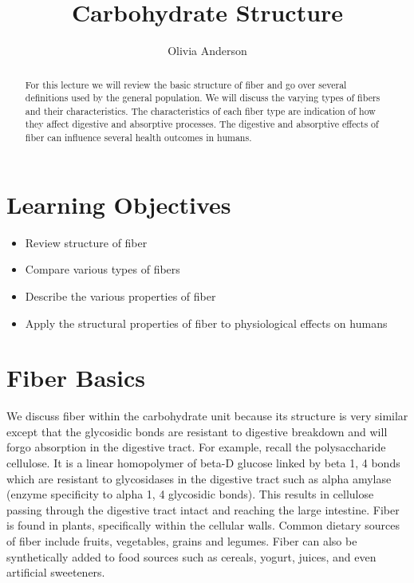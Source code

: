 \documentclass{tufte-handout}
\title{Carbohydrate Structure}
\author{Olivia Anderson}
\date{}  %
\begin{document}
\maketitle%
\begin{abstract}
For this lecture we will review the basic structure of fiber and go over several definitions used by the general population. We will discuss the varying types of fibers and their characteristics. The characteristics of each fiber type are indication of how they affect digestive and absorptive processes. The digestive and absorptive effects of fiber can influence several health outcomes in humans.
\end{abstract}

\tableofcontents


\pagebreak

\section{Learning Objectives}

\begin{itemize}

\item Review structure of fiber
\item Compare various types of fibers
\item Describe the various properties of fiber
\item Apply the structural properties of fiber to physiological effects on humans
\end{itemize}

\section{Fiber Basics}
We discuss fiber within the carbohydrate unit because its structure is very similar except that the glycosidic bonds are resistant to digestive breakdown and will forgo absorption in the digestive tract. For example, recall the polysaccharide cellulose. It is a linear homopolymer of beta-D glucose linked by beta 1, 4 bonds which are resistant to glycosidases in the digestive tract such as alpha amylase (enzyme specificity to alpha 1, 4 glycosidic bonds). This results in cellulose passing through the digestive tract intact and reaching the large intestine. Fiber is found in plants, specifically within the cellular walls. Common dietary sources of fiber include fruits, vegetables, grains and legumes. Fiber can also be synthetically added to food sources such as cereals, yogurt, juices, and even artificial sweeteners.
\end{document}
